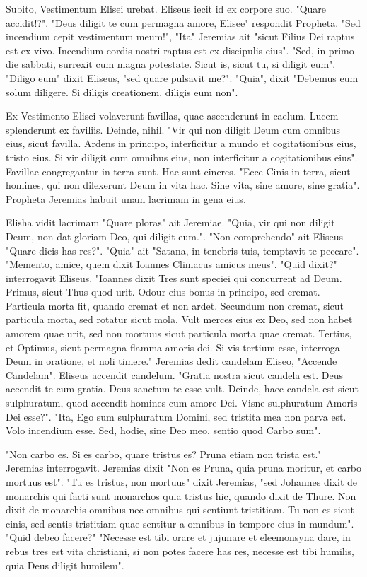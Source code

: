 Subito, Vestimentum Elisei urebat. Eliseus iecit id ex corpore suo. "Quare accidit!?". "Deus diligit te cum permagna amore, Elisee" respondit Propheta. "Sed incendium cepit vestimentum meum!", "Ita" Jeremias ait "sicut Filius Dei raptus est ex vivo. Incendium cordis nostri raptus est ex discipulis eius". "Sed, in primo die sabbati, surrexit cum magna potestate. Sicut is, sicut tu, si diligit eum". "Diligo eum" dixit Eliseus, "sed quare pulsavit me?". "Quia", dixit "Debemus eum solum diligere. Si diligis creationem, diligis eum non". \par 
Ex Vestimento Elisei volaverunt favillas, quae ascenderunt in caelum. Lucem splenderunt ex faviliis. Deinde, nihil. "Vir qui non diligit Deum cum omnibus eius, sicut favilla. Ardens in principo, interficitur a mundo et cogitationibus eius, tristo eius. Si vir diligit cum omnibus eius, non interficitur a cogitationibus eius". Favillae congregantur in terra sunt. Hae sunt cineres. "Ecce Cinis in terra, sicut homines, qui non dilexerunt Deum in vita hac. Sine vita, sine amore, sine gratia". Propheta Jeremias habuit unam lacrimam in gena eius. \par 
Elisha vidit lacrimam "Quare ploras" ait Jeremiae. "Quia, vir qui non diligit Deum, non dat gloriam Deo, qui diligit eum.". "Non comprehendo" ait Eliseus "Quare dicis has res?". "Quia" ait "Satana, in tenebris tuis, temptavit te peccare". "Memento, amice, quem dixit Ioannes Climacus amicus meus". "Quid dixit?" interrogavit Eliseus. "Ioannes dixit \: Tres sunt speciei qui concurrent ad Deum. Primus, sicut Thus quod urit. Odour eius bonus in principo, sed cremat. Particula morta fit, quando cremat et non ardet. Secundum non cremat, sicut particula morta, sed rotatur sicut mola. Vult merces eius ex Deo, sed non habet amorem quae urit, sed non mortuus sicut particula morta quae cremat. Tertius, et Optimus, sicut permagna flamma amoris dei. Si vis tertium esse, interroga Deum in oratione, et noli timere." Jeremias dedit candelam Eliseo, "Accende Candelam". Eliseus accendit candelum. "Gratia nostra sicut candela est. Deus accendit te cum gratia. Deus sanctum te esse vult. Deinde, haec candela est sicut sulphuratum, quod accendit homines cum amore Dei. Visne sulphuratum Amoris Dei esse?". "Ita, Ego sum sulphuratum Domini, sed tristita mea non parva est. Volo incendium esse. Sed, hodie, sine Deo meo, sentio quod Carbo sum".\par
"Non carbo es. Si es carbo, quare tristus es? Pruna etiam non trista est." Jeremias interrogavit. Jeremias dixit "Non es Pruna, quia pruna moritur, et carbo mortuus est". "Tu es tristus, non mortuus" dixit Jeremias, "sed Johannes dixit de monarchis qui facti sunt monarchos quia tristus hic, quando dixit de Thure. Non dixit de monarchis omnibus nec omnibus qui sentiunt tristitiam. Tu non es sicut cinis, sed sentis tristitiam quae sentitur a omnibus in tempore eius in mundum". "Quid debeo facere?" "Necesse est tibi orare et jujunare et eleemonsyna dare, in rebus tres est vita christiani, si non potes facere has res, necesse est tibi humilis, quia Deus diligit humilem".\par 
